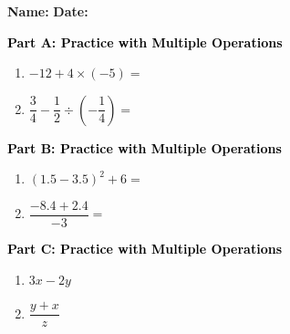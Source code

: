 \documentclass[12pt, letterpaper, fleqn]{article}
\begin{document}
\textbf{Name:} \underline{\hspace{5cm}}
\hfill
\textbf{Date:} \underline{\hspace{3cm}}\\

\begin{tcolorbox}[colback=customteal!20]
\large\textcolor{black}{\textbf{Part A: Practice with Multiple Operations}}
\end{tcolorbox}

\vspace{3mm}

\begin{enumerate}[itemsep=4.2cm, leftmargin=0.6cm]
\item $-12 + 4 \times (-5) =$
\item $\dfrac{3}{4} - \dfrac{1}{2} \div \left(-\dfrac{1}{4}\right) =$
\end{enumerate}

\newpage

\begin{tcolorbox}[colback=customteal!20]
\large\textcolor{black}{\textbf{Part B: Practice with Multiple Operations}}
\end{tcolorbox}

\vspace{3mm}

\begin{enumerate}[itemsep=4.2cm, leftmargin=0.6cm, resume]
\item $(1.5 - 3.5)^2 + 6 =$
\item $\dfrac{-8.4 + 2.4}{-3} =$
\end{enumerate}

\newpage

\begin{tcolorbox}[colback=customteal!20]
\large\textcolor{black}{\textbf{Part C: Practice with Multiple Operations}}
\end{tcolorbox}

\vspace{3mm}

\begin{enumerate}[itemsep=4.2cm, leftmargin=0.6cm, resume]
\item $3x - 2y$
\item $\dfrac{y + x}{z}$
\end{enumerate}
\end{document}
